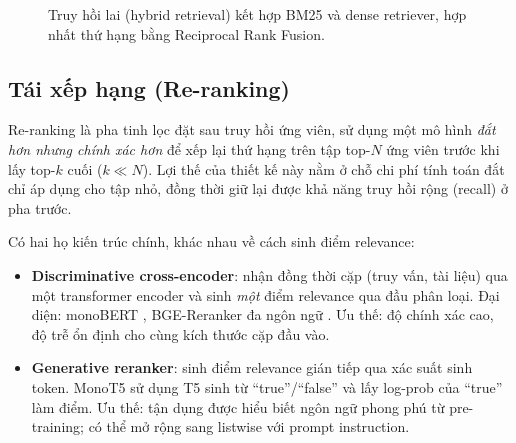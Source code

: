 \vspace{10pt}
\begin{figure}[!htb]
\centering
{}
\vspace{15pt}
\caption{Truy hồi lai (hybrid retrieval) kết hợp BM25 và dense retriever, hợp nhất thứ hạng bằng Reciprocal Rank Fusion.}
\label{fig:hybrid-rrf}
\end{figure}
\vspace{10pt}

\subsection{Tái xếp hạng (Re-ranking)}
\label{subsec:rerank}

Re-ranking là pha tinh lọc đặt sau truy hồi ứng viên, sử dụng một mô hình \textit{đắt hơn nhưng chính xác hơn} để xếp lại thứ hạng trên tập top-$N$ ứng viên trước khi lấy top-$k$ cuối ($k \ll N$). Lợi thế của thiết kế này nằm ở chỗ chi phí tính toán đắt chỉ áp dụng cho tập nhỏ, đồng thời giữ lại được khả năng truy hồi rộng (recall) ở pha trước.

Có hai họ kiến trúc chính, khác nhau về cách sinh điểm relevance:

\begin{itemize}
  \item \textbf{Discriminative cross-encoder}: nhận đồng thời cặp (truy vấn, tài liệu) qua một transformer encoder và sinh \textit{một} điểm relevance qua đầu phân loại. Đại diện: monoBERT \cite{nogueira2019passage}, BGE-Reranker đa ngôn ngữ \cite{bge_reranker_2024}. Ưu thế: độ chính xác cao, độ trễ ổn định cho cùng kích thước cặp đầu vào.
  \item \textbf{Generative reranker}: sinh điểm relevance gián tiếp qua xác suất sinh token. MonoT5 \cite{nogueira2020monot5} sử dụng T5 sinh từ ``true''/``false'' và lấy log-prob của ``true'' làm điểm. Ưu thế: tận dụng được hiểu biết ngôn ngữ phong phú từ pre-training; có thể mở rộng sang listwise với prompt instruction.
\end{itemize}

